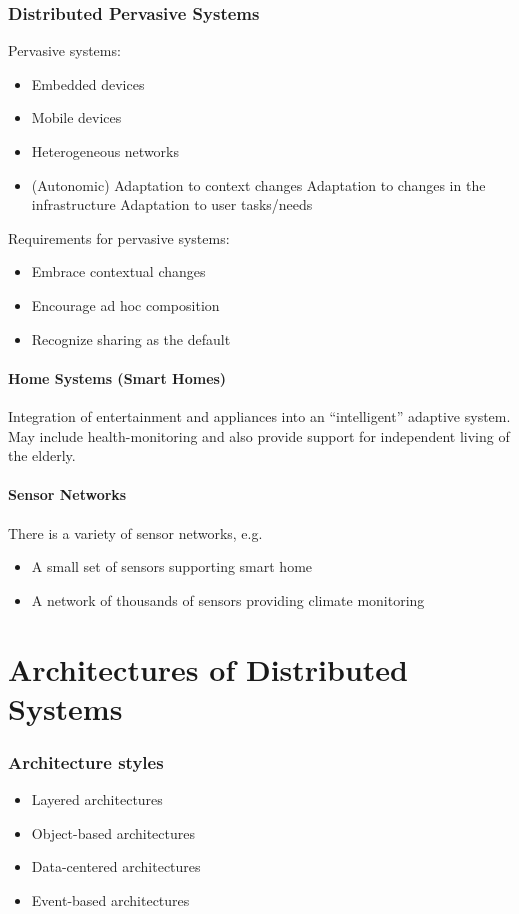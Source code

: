 \subsubsection{Distributed Pervasive Systems}
Pervasive systems:
\begin{itemize}
	\item Embedded devices
	\item Mobile devices
	\item Heterogeneous networks
	\item (Autonomic) Adaptation to context changes
	\subitem Adaptation to changes in the infrastructure
	\subitem Adaptation to user tasks/needs
\end{itemize}
Requirements for pervasive systems:
\begin{itemize}
	\item Embrace contextual changes
	\item Encourage ad hoc composition
	\item Recognize sharing as the default
\end{itemize}

\paragraph{Home Systems (Smart Homes)}
Integration of entertainment and appliances into an ``intelligent'' adaptive system. May include health-monitoring and also provide support for independent living of the elderly.

\paragraph{Sensor Networks}
There is a variety of sensor networks, e.g.
\begin{itemize}
	\item A small set of sensors supporting smart home
	\item A network of thousands of sensors providing climate monitoring
\end{itemize}

\section{Architectures of Distributed Systems}
\subsubsection{Architecture styles}
\begin{itemize}
	\item Layered architectures
	\item Object-based architectures
	\item Data-centered architectures
	\item Event-based architectures
\end{itemize}


